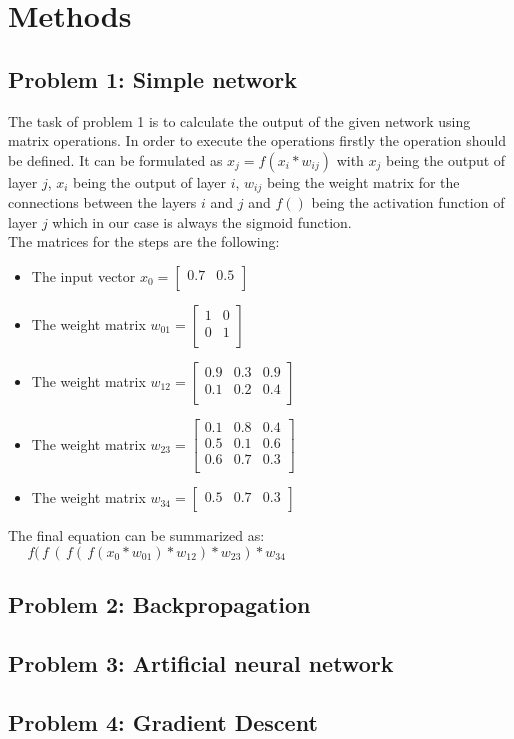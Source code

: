\chapter{Methods}
\section{Problem 1: Simple network}
The task of problem 1 is to calculate the output of the given network using matrix operations.
In order to execute the operations firstly the operation should be defined.
It can be formulated as $x_j=f(x_{i}*w_{ij})$ with $x_j$ being the output of layer $j$, $x_{i}$ being the output of layer $i$, $w_{ij}$ being the weight matrix for the connections between the layers $i$ and $j$ and $f()$ being the activation function of layer $j$ which in our case is always the sigmoid function.\\

The matrices for the steps are the following:
\begin{itemize}
  \item The input vector $x_0=\left[ \begin{array}{rr}
											0.7 & 0.5  \\ 
									\end{array}\right]$
  \item The weight matrix $w_01=\left[ \begin{array}{rr}
  											1 & 0 \\
											0 & 1  \\ 
									\end{array}\right]$
\item The weight matrix $w_12=\left[ \begin{array}{rrr}
  											0.9 & 0.3 & 0.9\\
											0.1 & 0.2 & 0.4\\				 
									\end{array}\right]$
									\item The weight matrix $w_23=\left[ \begin{array}{rrr}
  											0.1 & 0.8 & 0.4\\
											0.5 & 0.1 & 0.6\\
											0.6 & 0.7 & 0.3\\
															 
									\end{array}\right]$
\item The weight matrix $w_34=\left[ \begin{array}{rrr}
  											0.5 & 0.7 & 0.3\\													 
									\end{array}\right]$
\end{itemize}

The final equation can be summarized as:\\
$\;\;\;\;\;f(\,f\,(\,f(\,f(x_0*w_01)*w_12)*w_23)*w_34$
   
\section{Problem 2: Backpropagation}

\section{Problem 3: Artificial neural network}
\section{Problem 4: Gradient Descent}
